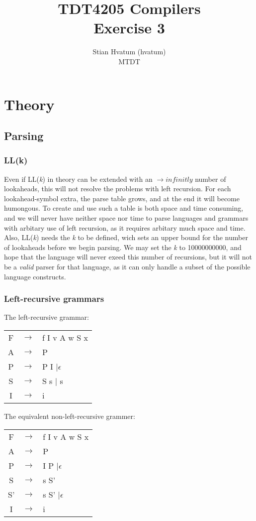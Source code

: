\documentclass{article}
\title{TDT4205 Compilers\\
\Huge Exercise 3}
\author{Stian Hvatum (hvatum)\\MTDT}
\begin{document}
\maketitle

\section{Theory}
\subsection{Parsing}
\subsubsection{LL(k)}
Even if LL(\textit{k}) in theory can be extended with an $\rightarrow infinitly$
number of lookaheads, this will not resolve the problems with left recursion. For each
lookahead-symbol extra, the parse table grows, and at the end it will become
humongous. To create and use such a table is both space and time consuming, and
we will never have neither space nor time to parse languages and grammars with arbitary use of left
recursion, as it requires arbitary much space and time. Also, LL(\textit{k}) needs the
\textit{k} to be defined, wich sets an upper bound for the number of lookaheads
before we begin parsing. We may set the \textit{k} to 10000000000, and hope that
the language will never exeed this number of recursions, but it will not be a
\emph{valid} parser for that language, as it can only handle a subset of the
possible language constructs.

\subsubsection{Left-recursive grammars}
The left-recursive grammar:\\
\begin{tabular}{ccl}
F & $\rightarrow$ & f I v A w S x \\ 
A & $\rightarrow$ & P \\
P & $\rightarrow$ & P I $| \epsilon$\\ 
S & $\rightarrow$ & S s $|$ s\\
I & $\rightarrow$ & i\\
\end{tabular}


The equivalent non-left-recursive grammer:\\
\begin{tabular}{ccl}
F & $\rightarrow$ & f I v A w S x \\ 
A & $\rightarrow$ & P \\
P & $\rightarrow$ & I P $| \epsilon$\\ 
S & $\rightarrow$ & s S'\\
S' & $\rightarrow$ & s S' $| \epsilon$\\
I & $\rightarrow$ & i\\
\end{tabular}
\end{document}
